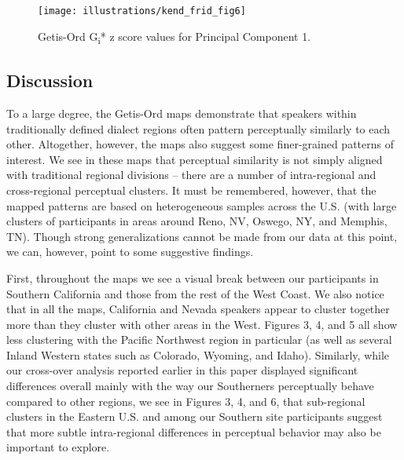 \documentclass[output=paper]{LSP/langsci}
\begin{document}
\begin{figure}
\texttt{[image: illustrations/kend\_frid\_fig6]}
\caption{Getis-Ord G\textsubscript{i}* z score values for Principal Component 1.}
\label{fig:6}
\end{figure}

\subsection{Discussion}
To a large degree, the Getis-Ord maps demonstrate that speakers within traditionally defined dialect regions often pattern perceptually similarly to each other. Altogether, however, the maps also suggest some finer-grained patterns of interest. We see in these maps that perceptual similarity is not simply aligned with traditional regional divisions – there are a number of intra-regional and cross-regional perceptual clusters. It must be remembered, however, that the mapped patterns are based on heterogeneous samples across the U.S. (with large clusters of participants in areas around Reno, NV, Oswego, NY, and Memphis, TN). Though strong generalizations cannot be made from our data at this point, we can, however, point to some suggestive findings.

First, throughout the maps we see a visual break between our participants in Southern California and those from the rest of the West Coast. We also notice that in all the maps, California and Nevada speakers appear to cluster together more than they cluster with other areas in the West. Figures 3, 4, and 5 all show less clustering with the Pacific Northwest region in particular (as well as several Inland Western states such as Colorado, Wyoming, and Idaho). Similarly, while our cross-over analysis reported earlier in this paper displayed significant differences overall mainly with the way our Southerners perceptually behave compared to other regions, we see in Figures 3, 4, and 6, that sub-regional clusters in the Eastern U.S. and among our Southern site participants suggest that more subtle intra-regional differences in perceptual behavior may also be important to explore.  
\end{document}
